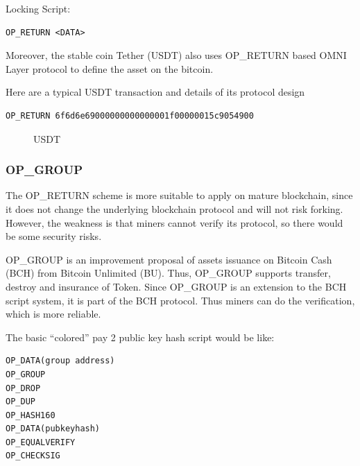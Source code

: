 \documentclass[a4paper,11pt]{article}
\begin{document}
Locking Script:
\begin{lstlisting}
OP_RETURN <DATA>
\end{lstlisting}

Moreover, the stable coin Tether\cite{Tether} (USDT) also uses OP\_RETURN based OMNI Layer protocol to define the asset on the bitcoin.

Here are a typical USDT transaction and details of its protocol design


\lstset{basicstyle=\tiny,style=myListStyle}
\begin{lstlisting}
OP_RETURN 6f6d6e69000000000000001f00000015c9054900
\end{lstlisting}


\begin{figure}[hbt]
	\centerline{%
	}
\caption{USDT}
\end{figure}





\subsubsection*{OP\_GROUP}
The OP\_RETURN  scheme is more suitable to apply on mature blockchain, since it does not change the underlying blockchain protocol and will not risk forking. However, the weakness is that miners cannot verify its protocol, so there would be some security risks.

OP\_GROUP\cite{OP_GROUP}  is an improvement proposal of assets issuance on Bitcoin Cash (BCH)\cite{BCH} from Bitcoin Unlimited (BU). Thus, OP\_GROUP  supports transfer, destroy and insurance of Token. Since OP\_GROUP is an extension to the BCH script system,  it is part of the BCH protocol. Thus miners can do the verification, which is more reliable.

The basic “colored” pay 2 public key hash script would be like:

\lstset{basicstyle=\tiny,style=myListStyle}
\begin{lstlisting}[numbers=none]
OP_DATA(group address)
OP_GROUP
OP_DROP
OP_DUP
OP_HASH160
OP_DATA(pubkeyhash)
OP_EQUALVERIFY
OP_CHECKSIG
\end{lstlisting}
\end{document}
